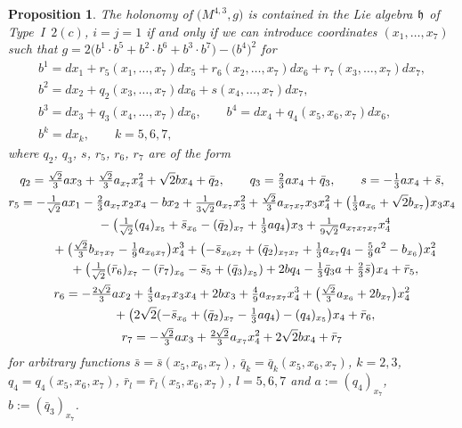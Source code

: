 \documentclass[11pt]{article}
\numberwithin{equation}{section}
\newtheorem{Proposition}[Theorem]{Proposition}
 { \theoremstyle{definition}
\newtheorem{Definition}[Theorem]{Definition}
\newtheorem{Example}[Theorem]{Example}
\newtheorem{Remark}[Theorem]{Remark} }
\newcommand\fh{{\frak h}}
\begin{document}
\begin{Proposition} The holonomy of $\big(M^{4,3},g\big)$ is contained in the Lie algebra $\fh$ of Type~I~$2(c)$, $i=j=1$ if and only if we can introduce coordinates $(x_1,\dots, x_7)$ such that $g=2\big(b^1\cdot b^5+b^2\cdot b^6+b^3\cdot b^7\big)- \big(b^4\big)^2$ for
\begin{gather*}
b^1= dx_1 + r_5(x_1,\dots, x_7)dx_5+r_6(x_2,\dots,x_7)dx_6+r_7(x_3,\dots,x_7)dx_7, \\
b^2= dx_2+q_2(x_3,\dots,x_7)dx_6 +s(x_4,\dots,x_7)dx_7, \\
b^3= dx_3+q_3(x_4,\dots,x_7) dx_6, \qquad
b^4= dx_4+q_4(x_5,x_6,x_7)dx_6, \\
b^k= dx_k,\qquad k=5,6,7 ,
\end{gather*}
where $q_2$, $q_3$, $s$, $r_5$, $r_6$, $r_7$ are of the form
\begin{gather*}
q_2 = \tfrac {\sqrt2} 3ax_3+\tfrac {\sqrt2} 3 a_{ x_7}x_4^2 +\sqrt2 b x_4+\bar q_2,\qquad
q_3 = \tfrac 23 a x_4+\bar q_3,\qquad
s = -\tfrac13 a x_4+\bar s, \\
r_5 = -\tfrac 1{\sqrt 2} a x_1 -\tfrac 23 a_{x_7} x_2 x_4 -b x_2 +\tfrac 1{3\sqrt2} a_{x_7} x_3^2 +\tfrac{\sqrt2}3 a_{x_7 x_7 }x_3 x_4^2+\big( \tfrac13 a_{x_6} +\sqrt2 b_{x_7}\big) x_3 x_4 \\
\hphantom{r_5 =}{} -\big( \tfrac1{\sqrt2} (q_4)_{x_5} + \bar s_{x_6} - (\bar q_2)_{x_7} +\tfrac13 a q_4\big) x_3 +\tfrac1{9\sqrt2} a_{x_7 x_7 x_7} x_4^4 \\
\hphantom{r_5 =}{}+\big(\tfrac{\sqrt2}3 b_{x_7 x_7}-\tfrac19 a_{x_6 x_7}\big) x_4^3 +\big( {-}\bar s_{x_6 x_7}+(\bar q_2)_{x_7 x_7} +\tfrac13 a_{x_7}q_4 -\tfrac59 a^2 -b_{x_6}\big) x_4^2 \\
\hphantom{r_5 =}{} +\big( \tfrac1{\sqrt2} (\bar r_6)_{x_7}-(\bar r_7)_{x_6} -\bar s_5 +(\bar q_3)_{x_5}) +2b q_4 -\tfrac13 \bar q_3 a +\tfrac23 \bar s\big) x_4 +\bar r_5,\\
r_6=-\tfrac{2\sqrt2}3 a x_2 +\tfrac43 a_{x_7} x_3 x_4 +2b x_3 +\tfrac49 a_{x_7 x_7} x_4^3 +\big(\tfrac{\sqrt2}3 a_{x_6} +2b_{x_7}\big) x_4^2 \\
\hphantom{r_6=}{}+\big( 2\sqrt2 (-\bar s_{x_6} +(\bar q_2)_{x_7}-\tfrac13 a q_4) -(q_4)_{x_5}\big) x_4 + \bar r_6,\\
r_7=-\tfrac{\sqrt2}3 a x_3 +\tfrac{2\sqrt2}3 a_{x_7} x_4^2 +2\sqrt2 b x_4 +\bar r_7
\end{gather*}
for arbitrary functions $\bar s=\bar s(x_5,x_6,x_7)$, $\bar q_k=\bar q_k(x_5,x_6,x_7)$, $k=2,3$, $q_4=q_4(x_5,x_6,x_7)$, $\bar r_l=\bar r_l(x_5,x_6,x_7)$, $l=5,6,7$ and $a:= (q_4)_{x_7}$, $b:= (\bar q_3)_{x_7}$.
\end{Proposition}
\end{document}
